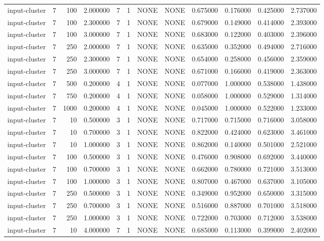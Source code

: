 \begin{tabular}{lrrrllllrrrr}
input-cluster & 7 & 100 & 2.000000 & 7 & 1 & NONE & NONE & 0.675000 & 0.176000 & 0.425000 & 2.737000 \\
input-cluster & 7 & 100 & 2.300000 & 7 & 1 & NONE & NONE & 0.679000 & 0.149000 & 0.414000 & 2.393000 \\
input-cluster & 7 & 100 & 3.000000 & 7 & 1 & NONE & NONE & 0.683000 & 0.122000 & 0.403000 & 2.396000 \\
input-cluster & 7 & 250 & 2.000000 & 7 & 1 & NONE & NONE & 0.635000 & 0.352000 & 0.494000 & 2.716000 \\
input-cluster & 7 & 250 & 2.300000 & 7 & 1 & NONE & NONE & 0.654000 & 0.258000 & 0.456000 & 2.359000 \\
input-cluster & 7 & 250 & 3.000000 & 7 & 1 & NONE & NONE & 0.671000 & 0.166000 & 0.419000 & 2.363000 \\
input-cluster & 7 & 500 & 0.200000 & 4 & 1 & NONE & NONE & 0.077000 & 1.000000 & 0.538000 & 1.438000 \\
input-cluster & 7 & 750 & 0.200000 & 4 & 1 & NONE & NONE & 0.058000 & 1.000000 & 0.529000 & 1.314000 \\
input-cluster & 7 & 1000 & 0.200000 & 4 & 1 & NONE & NONE & 0.045000 & 1.000000 & 0.522000 & 1.233000 \\
input-cluster & 7 & 10 & 0.500000 & 3 & 1 & NONE & NONE & 0.717000 & 0.715000 & 0.716000 & 3.058000 \\
input-cluster & 7 & 10 & 0.700000 & 3 & 1 & NONE & NONE & 0.822000 & 0.424000 & 0.623000 & 3.461000 \\
input-cluster & 7 & 10 & 1.000000 & 3 & 1 & NONE & NONE & 0.862000 & 0.140000 & 0.501000 & 2.521000 \\
input-cluster & 7 & 100 & 0.500000 & 3 & 1 & NONE & NONE & 0.476000 & 0.908000 & 0.692000 & 3.440000 \\
input-cluster & 7 & 100 & 0.700000 & 3 & 1 & NONE & NONE & 0.662000 & 0.780000 & 0.721000 & 3.513000 \\
input-cluster & 7 & 100 & 1.000000 & 3 & 1 & NONE & NONE & 0.807000 & 0.467000 & 0.637000 & 3.105000 \\
input-cluster & 7 & 250 & 0.500000 & 3 & 1 & NONE & NONE & 0.349000 & 0.952000 & 0.650000 & 3.315000 \\
input-cluster & 7 & 250 & 0.700000 & 3 & 1 & NONE & NONE & 0.516000 & 0.887000 & 0.701000 & 3.518000 \\
input-cluster & 7 & 250 & 1.000000 & 3 & 1 & NONE & NONE & 0.722000 & 0.703000 & 0.712000 & 3.538000 \\
input-cluster & 7 & 10 & 4.000000 & 7 & 1 & NONE & NONE & 0.685000 & 0.113000 & 0.399000 & 2.402000 \\

\end{tabular}
